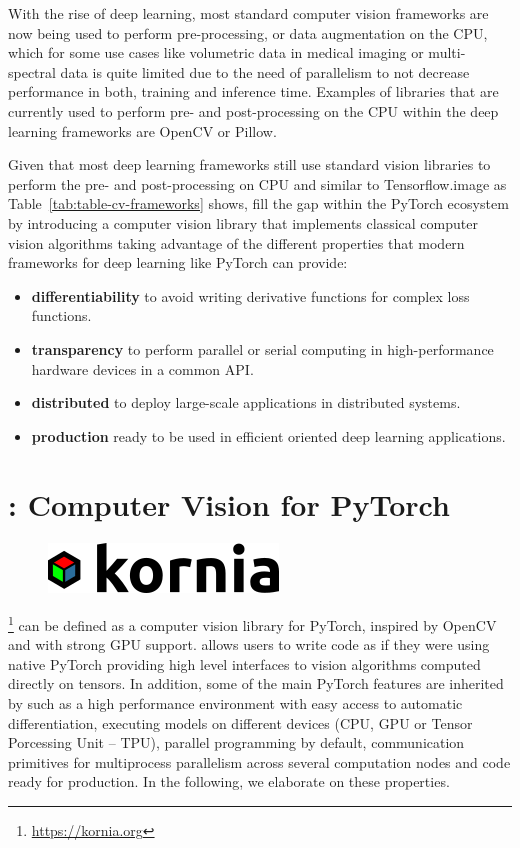 With the rise of deep learning, most standard computer vision frameworks are now being used to perform pre-processing, or data augmentation on the CPU, which for some use cases like volumetric data in medical imaging or multi-spectral data is quite limited due to the need of parallelism to not decrease performance in both, training and inference time. Examples of libraries that are currently used to perform pre- and post-processing on the CPU within the deep learning frameworks are OpenCV or Pillow.

Given that most  deep learning frameworks still use standard vision libraries to perform the pre- and post-processing on CPU and similar to Tensorflow.image {as Table~\ref{tab:table-cv-frameworks} shows, \lib{} fill the gap} within the PyTorch ecosystem by introducing a computer vision library that implements classical computer vision algorithms taking advantage of the different properties that modern frameworks for deep learning like PyTorch can provide:

\begin{itemize}
	\item \textbf{differentiability} to avoid writing derivative functions for complex loss functions.
	\item \textbf{transparency} to perform parallel or serial computing in high-performance hardware devices in a common API.
	\item \textbf{distributed} to deploy large-scale applications in distributed systems.
	\item \textbf{production} ready to be used in efficient oriented deep learning applications.
\end{itemize}

\newpage

\section{\lib: Computer Vision for PyTorch}
\label{section:kornia}

\begin{figure}[h]
\centering
\includegraphics[scale=0.30]{main/chapter03/data/kornia_logo.png}
\label{fig:kornia_logo}
\end{figure}

\lib\footnote{\url{https://kornia.org}} can be defined as a computer vision library for PyTorch, inspired by OpenCV and with strong GPU support. \lib{} allows users to write code as if they were using native PyTorch providing high level interfaces to vision algorithms computed directly on tensors. In addition, some of the main PyTorch features are inherited by \lib{} such as a high performance environment with easy access to automatic differentiation, executing models on different devices (CPU, GPU or Tensor Porcessing Unit -- TPU), parallel programming by default, communication primitives for multiprocess parallelism across several computation nodes and code ready for production. In the following, we elaborate on these properties.

